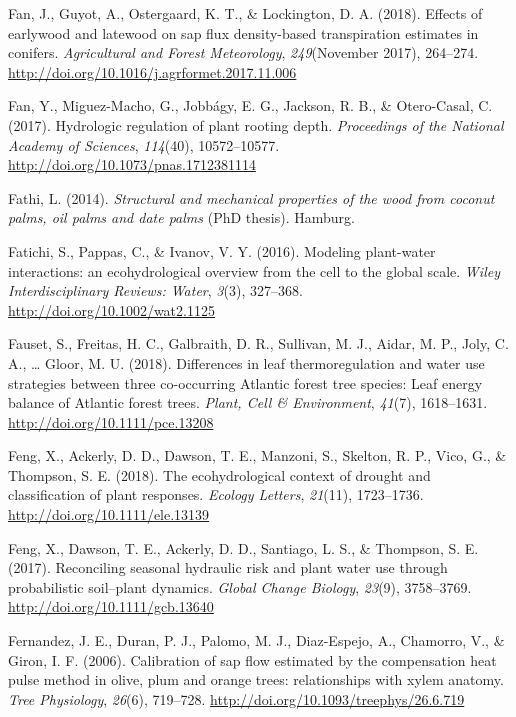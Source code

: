 \documentclass[11pt,twoside]{reedthesis}
\begin{document}
\hypertarget{ref-Fan2018}{}
Fan, J., Guyot, A., Ostergaard, K. T., \& Lockington, D. A. (2018).
Effects of earlywood and latewood on sap flux density-based
transpiration estimates in conifers. \emph{Agricultural and Forest
Meteorology}, \emph{249}(November 2017), 264--274.
\url{http://doi.org/10.1016/j.agrformet.2017.11.006}

\hypertarget{ref-fan_hydrologic_2017}{}
Fan, Y., Miguez-Macho, G., Jobbágy, E. G., Jackson, R. B., \&
Otero-Casal, C. (2017). Hydrologic regulation of plant rooting depth.
\emph{Proceedings of the National Academy of Sciences}, \emph{114}(40),
10572--10577. \url{http://doi.org/10.1073/pnas.1712381114}

\hypertarget{ref-Fathi2014}{}
Fathi, L. (2014). \emph{Structural and mechanical properties of the wood
from coconut palms, oil palms and date palms} (PhD thesis). Hamburg.

\hypertarget{ref-Fatichi2016}{}
Fatichi, S., Pappas, C., \& Ivanov, V. Y. (2016). Modeling plant-water
interactions: an ecohydrological overview from the cell to the global
scale. \emph{Wiley Interdisciplinary Reviews: Water}, \emph{3}(3),
327--368. \url{http://doi.org/10.1002/wat2.1125}

\hypertarget{ref-fauset_differences_2018}{}
Fauset, S., Freitas, H. C., Galbraith, D. R., Sullivan, M. J., Aidar, M.
P., Joly, C. A., \ldots{} Gloor, M. U. (2018). Differences in leaf
thermoregulation and water use strategies between three co-occurring
Atlantic forest tree species: Leaf energy balance of Atlantic forest
trees. \emph{Plant, Cell \& Environment}, \emph{41}(7), 1618--1631.
\url{http://doi.org/10.1111/pce.13208}

\hypertarget{ref-feng_ecohydrological_2018}{}
Feng, X., Ackerly, D. D., Dawson, T. E., Manzoni, S., Skelton, R. P.,
Vico, G., \& Thompson, S. E. (2018). The ecohydrological context of
drought and classification of plant responses. \emph{Ecology Letters},
\emph{21}(11), 1723--1736. \url{http://doi.org/10.1111/ele.13139}

\hypertarget{ref-feng_reconciling_2017}{}
Feng, X., Dawson, T. E., Ackerly, D. D., Santiago, L. S., \& Thompson,
S. E. (2017). Reconciling seasonal hydraulic risk and plant water use
through probabilistic soil--plant dynamics. \emph{Global Change
Biology}, \emph{23}(9), 3758--3769.
\url{http://doi.org/10.1111/gcb.13640}

\hypertarget{ref-Fernandez2006}{}
Fernandez, J. E., Duran, P. J., Palomo, M. J., Diaz-Espejo, A.,
Chamorro, V., \& Giron, I. F. (2006). Calibration of sap flow estimated
by the compensation heat pulse method in olive, plum and orange trees:
relationships with xylem anatomy. \emph{Tree Physiology}, \emph{26}(6),
719--728. \url{http://doi.org/10.1093/treephys/26.6.719}
\end{document}
